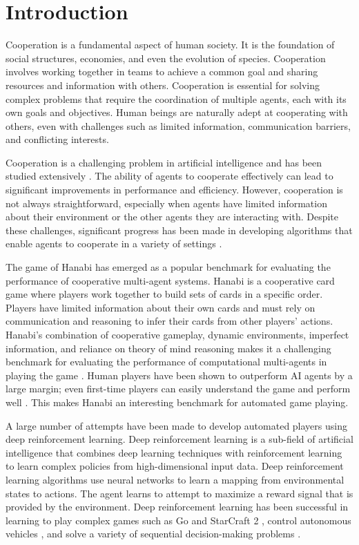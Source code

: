 \section{Introduction}
Cooperation is a fundamental aspect of human society. It is the foundation of social structures, economies, and even the evolution of species. Cooperation involves working together in teams to achieve a common goal and sharing resources and information with others. Cooperation is essential for solving complex problems that require the coordination of multiple agents, each with its own goals and objectives. Human beings are naturally adept at cooperating with others, even with challenges such as limited information, communication barriers, and conflicting interests.

Cooperation is a challenging problem in artificial intelligence and has been studied extensively \cite{yuanSurveyProgressCooperative2023}. The ability of agents to cooperate effectively can lead to significant improvements in performance and efficiency. However, cooperation is not always straightforward, especially when agents have limited information about their environment or the other agents they are interacting with. Despite these challenges, significant progress has been made in developing algorithms that enable agents to cooperate in a variety of settings \cite{huSimplifiedActionDecoder2021, liACECooperativeMultiagent2022}.

The game of Hanabi has emerged as a popular benchmark for evaluating the performance of cooperative multi-agent systems. Hanabi is a cooperative card game where players work together to build sets of cards in a specific order. Players have limited information about their own cards and must rely on communication and reasoning to infer their cards from other players' actions. Hanabi's combination of cooperative gameplay, dynamic environments, imperfect information, and reliance on theory of mind reasoning makes it a challenging benchmark for evaluating the performance of computational multi-agents in playing the game \cite{bardHanabiChallengeNew2020a}. Human players have been shown to outperform AI agents by a large margin; even first-time players can easily understand the game and perform well \cite{sidjiHiddenRulesHanabi2023, ArtificialIntelligenceSmart2021}. This makes Hanabi an interesting benchmark for automated game playing. 

A large number of attempts have been made to develop automated players using deep reinforcement learning. Deep reinforcement learning is a sub-field of artificial intelligence that combines deep learning techniques with reinforcement learning to learn complex policies from high-dimensional input data. Deep reinforcement learning algorithms use neural networks to learn a mapping from environmental states to actions. The agent learns to attempt to maximize a reward signal that is provided by the environment. Deep reinforcement learning has been successful in learning to play complex games such as Go \cite{AlphaGoGoogleDeepMind} and StarCraft 2 \cite{googleAlphaStarMasteringRealtime2019}, control autonomous vehicles \cite{bhallaDeepMultiAgent2020}, and solve a variety of sequential decision-making problems \cite{mnihPlayingAtariDeep2013}.

